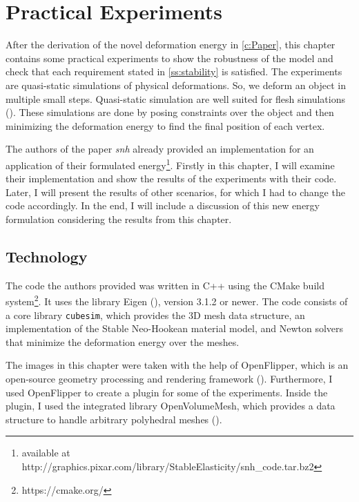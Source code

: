 \chapter{Practical Experiments} 
\label{c:Experiments}
After the derivation of the novel deformation energy in \autoref{c:Paper}, this chapter contains some practical experiments to show the robustness of the model and check that each requirement stated in \autoref{ss:stability} is satisfied. The experiments are quasi-static simulations of physical deformations. So, we deform an object in multiple small steps. Quasi-static simulation are well suited for flesh simulations (\cite{teran2005robust}). These simulations are done by posing constraints over the object and then minimizing the deformation energy to find the final position of each vertex.
 
The authors of the paper \textit{\acrshort{snh}} already provided an implementation for an application of their formulated energy\footnote{available at http://graphics.pixar.com/library/StableElasticity/snh\_code.tar.bz2}. Firstly in this chapter, I will examine their implementation and show the results of the experiments with their code. Later, I will present the results of other scenarios, for which I had to change the code accordingly. In the end, I will include a discussion of this new energy formulation considering the results from this chapter.

\section{Technology}
The code the authors provided was written in C++ using the CMake build system\footnote{https://cmake.org/}. It uses the library Eigen (\cite{eigenweb}), version 3.1.2 or newer. The code consists of a core library \verb|cubesim|, which provides the 3D mesh data structure, an implementation of the Stable Neo-Hookean material model, and Newton solvers that minimize the deformation energy over the meshes.

The images in this chapter were taken with the help of OpenFlipper, which is an open-source geometry processing and rendering framework (\cite{mobius2010openflipper}). Furthermore, I used OpenFlipper to create a plugin for some of the experiments. Inside the plugin, I used the integrated library OpenVolumeMesh, which provides a data structure to handle arbitrary polyhedral meshes (\cite{kremer2013openvolumemesh}).

